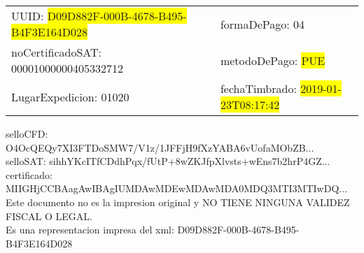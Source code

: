 \documentclass{article}
\begin{document}
\begin{tabular}{p{11cm}p{1cm}p{8cm}}
\bigskip
UUID: \colorbox{yellow}{ D09D882F-000B-4678-B495-B4F3E164D028 } & & formaDePago: 04\\

noCertificadoSAT: 00001000000405332712 & & metodoDePago: \colorbox{yellow}{ PUE }\\

LugarExpedicion: 01020 & & fechaTimbrado: \colorbox{yellow}{ 2019-01-23T08:17:42 } \\
\end{tabular}

\bigskip
selloCFD: O4OcQEQy7XI3FTDoSMW7/V1z/1JFFjH9fXzYABA6vUofaMObZB... \\
selloSAT: sihhYKcITfCDdhPqx/fUtP+8wZKJfpXlvsts+wEns7b2hrP4GZ... \\

certificado: MIIGHjCCBAagAwIBAgIUMDAwMDEwMDAwMDA0MDQ3MTI3MTIwDQ...\bigskip\bigskip\bigskip\bigskip\bigskip\bigskip
\\Este documento no es la impresion original y NO TIENE NINGUNA VALIDEZ FISCAL O LEGAL. \\
 Es una representacion impresa del xml:  D09D882F-000B-4678-B495-B4F3E164D028 \\
\end{document}
